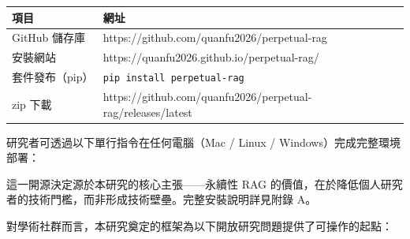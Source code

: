 {\def\LTcaptype{none} %
\begin{longtable}[]{@{}
  >{\raggedright\arraybackslash}p{}
  >{\raggedright\arraybackslash}p{}@{}}
\toprule\noalign{}
\begin{minipage}[b]{\linewidth}\raggedright
項目
\end{minipage} & \begin{minipage}[b]{\linewidth}\raggedright
網址
\end{minipage} \\
\midrule\noalign{}
\endhead
\bottomrule\noalign{}
\endlastfoot
GitHub 儲存庫 & https://github.com/quanfu2026/perpetual-rag \\
安裝網站 & https://quanfu2026.github.io/perpetual-rag/ \\
套件發布（pip） & \texttt{pip\ install\ perpetual-rag} \\
zip 下載 &
https://github.com/quanfu2026/perpetual-rag/releases/latest \\
\end{longtable}
}

研究者可透過以下單行指令在任何電腦（Mac / Linux /
Windows）完成完整環境部署：

\begin{Shaded}
\begin{Highlighting}[]
 \KeywordTok{|} 

\KeywordTok{\&\&} 
\end{Highlighting}
\end{Shaded}

這一開源決定源於本研究的核心主張------永續性 RAG
的價值，在於降低個人研究者的技術門檻，而非形成技術壁壘。完整安裝說明詳見附錄
A。

對學術社群而言，本研究奠定的框架為以下開放研究問題提供了可操作的起點：

